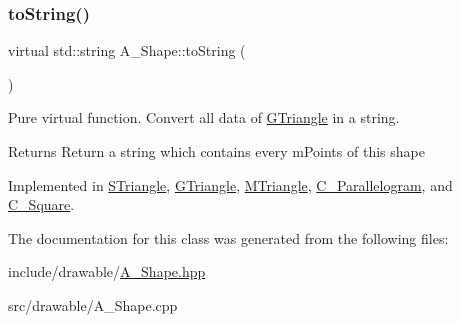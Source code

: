 \subsubsection{\texorpdfstring{to\+String()}{aToString()}}
{\footnotesize\ttfamily virtual std\+::string A_Shape\+::to\+String (\begin{DoxyParamCaption}{ }\end{DoxyParamCaption})\hspace{0.3cm}{\ttfamily [pure virtual]}}



Pure virtual function. Convert all data of \hyperlink{classGTriangle}{G\+Triangle} in a string. 

\begin{DoxyReturn}{Returns}
Return a string which contains every mPoints of this shape
\end{DoxyReturn}


Implemented in \hyperlink{classSTriangle_a32e4cee65f52d9ee4121c78dc97d86ab}{S\+Triangle}, \hyperlink{classGTriangle_a8381aeea39fac0d52ad9e0d45b791b3b}{G\+Triangle}, \hyperlink{classMTriangle_a7d1fd825592dffa6ac05b3398a8c105a}{M\+Triangle}, \hyperlink{classParallelogram_a9caae0044f23d8a1e87b1a78d852c37f}{C_Parallelogram}, and \hyperlink{classSquare_aa5d7db8004bba3c400f57513d93b21d4}{C_Square}.



The documentation for this class was generated from the following files\+:\begin{DoxyCompactItemize}
\item 
include/drawable/\hyperlink{Shape_8hpp}{A_Shape.\+hpp}\item
src/drawable/A_Shape.\+cpp\end{DoxyCompactItemize}
